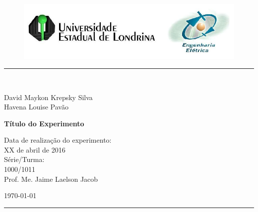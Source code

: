 \begin{titlepage}
\begin{center}
\begin{figure}[h]
\includegraphics[scale=0.76]{Imagens/topdotitulo.png}
\end{figure}
\rule{\columnwidth}{1.5mm}
\

\large David Maykon Krepsky Silva\\
\large Havena Louise Pavão

\vspace{4cm}
{\bf \Large Título do Experimento}
\vspace{3.5cm}

\begin{flushright}
Data de realização do experimento:\\
XX de abril de 2016\\
Série/Turma:\\
1000/1011\\
Prof. Me. Jaime Laelson Jacob 
\end{flushright}

\vspace{3.2cm}
\today

\rule{\columnwidth}{1.3mm}
\end{center}
\end{titlepage}